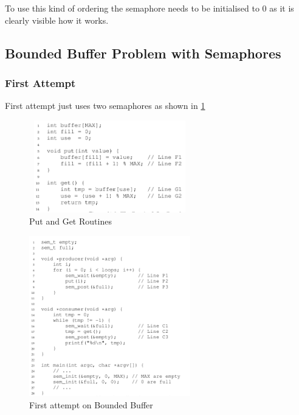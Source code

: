 To use this kind of ordering the semaphore needs to be initialised to 0 as it
is clearly visible how it works.

\subsection{Bounded Buffer Problem with Semaphores}

\subsubsection{First Attempt}

First attempt just uses two semaphores as shown in \ref{3110}

\begin{figure}[h!]
    \begin{center}
        \includegraphics[width=7cm, height=4cm]{img/319.png}
        \caption{Put and Get Routines}
    \end{center}
\end{figure}

\begin{figure}[h!]
    \label{3110}
    \begin{center}
        \includegraphics[width=7cm, height=7cm]{img/3110.png}
        \caption{First attempt on Bounded Buffer}
    \end{center}
\end{figure}

